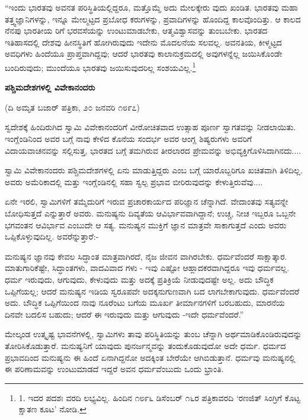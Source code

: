 “ಇಂದು ಭಾರತವು ಅವನತ ಪರಿಸ್ಥಿತಿಯಲ್ಲಿದ್ದರೂ, ಮತ್ತೊಮ್ಮೆ ಅದು ಮೇಲಕ್ಕೇರು ವುದು ಖಂಡಿತ. ಭಾರತವು ಮಹಾ ತತ್ತ್ವಜ್ಞಾನಿಗಳನ್ನು, ಇನ್ನೂ ಮೇಲ್ಮಟ್ಟದ ಪ್ರಬೋಧ ಕರುಗಳನ್ನು, ಪ್ರವಾದಿಗಳನ್ನು ಹೊಂದಿದ್ದ ಕಾಲವೊಂದಿತ್ತು. ಆ ಕಾಲದ ನೆನಪು ಭಾರತೀಯ ರಿಗೆ ಭರವಸೆಯನ್ನು ಉಂಟುಮಾಡಬೇಕು, ಆತ್ಮವಿಶ್ವಾಸವನ್ನು ತುಂಬಬೇಕು. ಭಾರತದ ಇತಿಹಾಸದಲ್ಲಿ ದೇಶವು ಹೀನಸ್ಥಿತಿಗೆ ಹೋಗಿರುವುದು ಇದೇನು ಮೊದಲನೆಯ ಸಲವಲ್ಲ. ಅವನತಿಯ, ಕೀಳ್ಮಟ್ಟದ ಅವಧಿಗಳು ಹಿಂದೆಯೂ ಪ್ರಾಪ್ತವಾಗಿದ್ದವು; ಆದರೆ ಭಾರತವು ಕಾಲಾನುಕ್ರಮದಲ್ಲಿ ಅವುಗಳನ್ನೆಲ್ಲ ಜಯಿಸಿಕೊಂಡೇ ಬಂದಿರುವುದು; ಮುಂದೆಯೂ ಭಾರತವು ಜಯಿಸುವುದರಿಲ್ಲ ಸಂಶಯವಿಲ್ಲ.\footnote{1. ಇದರ ಪದಶಃ ವರದಿ ಲಭ್ಯವಿಲ್ಲ. ಹಿಂದಿನ ೧೮೯೬ ಡಿಸೆಂಬರ್ ೧೬ರ ಪತ್ರಿಕಾವರದಿ ‘ರಣಜಿತ್ ಸಿಂಗ್ರಿಗೆ ಕೊಟ್ಟ ಕ್ಷಾತಣ ಕೂಟ’ ನೋಡಿ.}

\begin{center}
\textbf{ಪಶ್ಚಿಮದೇಶಗಳಲ್ಲಿ ವಿವೇಕಾನಂದರು}
\end{center}

\begin{center}
(ದಿ ಅಮೃತ ಬಜಾರ್ ಪತ್ರಿಕಾ, ೨೦ ಜನವರಿ ೧೮೯೭)
\end{center}

ಸ್ವದೇಶಕ್ಕೆ ಹಿಂದಿರುಗಿದ ಸ್ವಾಮಿ ವಿವೇಕಾನಂದರಿಗೆ ವೀರೋಚಿತವಾದ ಉತ್ಸಾಹ ಪೂರ್ಣ ಸ್ವಾಗತವನ್ನು ನೀಡಲಾಯಿತು. ಇಂಗ್ಲೆಂಡಿನಿಂದ ಅವರ ಬಗ್ಗೆ ನಾವು ಕೇಳಿದ ಕೊನೆಯ ಸಂದರ್ಭ ಅವರ ಆಂಗ್ಲ ಶಿಷ್ಯರುಗಳು ಅವರಿಗೆ ವಿದಾಯವಾಚನವನ್ನು ಸಲ್ಲಿಸುತ್ತ, ಭಾರತದ ಬಗ್ಗೆ ತಮಗಿರುವ ತೀರಲಾರದ ಪ್ರೇಮವನ್ನು ಅಭಿವ್ಯಕ್ತಿಗೊಳಿಸಿದಾಗಿನದು....

ಸ್ವಾಮಿ ವಿವೇಕಾನಂದರು ಪಶ್ಚಿಮದೇಶಗಳಲ್ಲಿ ಏನು ಮಾಡುತ್ತಿದ್ದರು ಎಂಬ ಬಗ್ಗೆ ಯಾರೊಬ್ಬರಿಗೂ ಖಚಿತವಾಗಿ ತಿಳಿದಿಲ್ಲ. ಅವರು ಅಮೆರಿಕಾದಲ್ಲಿ ಮತ್ತು ಇಂಗ್ಲೆಂಡಿನಲ್ಲಿ ಸಹಾ ಸ್ವಲ್ಪ ಪ್ರಭಾವ ಬೀರಿರುವುದನ್ನು ಕೇಳುತ್ತಿರುವೆವು....

ಏನೇ ಇರಲಿ, ಸ್ವಾಮಿಗಳಿಗೆ ತಮ್ಮೆದುರಿಗೆ ಇರುವ ಪ್ರಚಾರಕಾರ್ಯದ ಪರಿಜ್ಞಾನ ಚೆನ್ನಾಗಿದೆ. ವೇದಾಂತವು ಸತ್ಯವನ್ನೇ ಬೋಧಿಸುತ್ತದೆ ಎನ್ನುತ್ತಾರೆ ಅವರು. ಮನುಷ್ಯನು ದಿವ್ಯತೆಯ ಆವಿರ್ಭಾವವಾಗಿದ್ದಾನೆ; ಉಚ್ಚ, ನೀಚ ಇಬ್ಬರೂ ಒಬ್ಬನೇ ಭಗವಂತನ ಆವಿರ್ಭಾವ ಎಂಬುದೇ ಆ ಸತ್ಯ. ಮನುಷ್ಯನ ಮುಕ್ತಿಗೆ ಜ್ಞಾನ ಮಾತ್ರವೇ ಸಾಕಾಗುತ್ತದೆ ಎಂದು ಅವರು ಒಪ್ಪಿಕೊಳ್ಳುವುದಿಲ್ಲ. ಅವರೆನ್ನುತ್ತಾರೆ:-

ಮನುಷ್ಯನ ಜ್ಞಾನವು ಕೇವಲ ಸಿದ್ಧಾಂತ ಮಾತ್ರವಾಗಿರದೆ, ನೈಜ ಜೀವನ ವಾಗಿರಬೇಕು. ಧರ್ಮವೆಂದರೆ ಸಾಕ್ಷಾತ್ಕಾರ. ಮಾತುಗಾರಿಕೆಷ್ಟೇ, ಸಿದ್ಧಾಂತಗಳು, ವಾದವಿವಾದ ಗಳು - ಇವು ಎಷ್ಟೋ ಆಹ್ಲಾದಕರವಾಗಿದ್ದರೂ ಇವು ಧರ್ಮವಲ್ಲ. ಧರ್ಮ ಇರುವುದು, ಆಗುವುದು, ಕೇಳುವುದು ಮತ್ತು ಅದಕ್ಕೆ ಪ್ರತಿಕ್ರಿಯೆ ನೀಡುವುದಷ್ಟೇ ಅಲ್ಲ. ಅದು ಬೌದ್ಧಿಕ ಒಪ್ಪಿಗೆಯಲ್ಲ; ಆದರೆ ಮನುಷ್ಯನ ಇಡಿಯ ಸ್ವರೂಪವೇ ಅದಕ್ಕನುಗುಣವಾಗಿ ಬದ ಲಾಗಬೇಕಾಗುವುದು. ಧರ್ಮವೆಂದರೆ ಅದು. ಬೌದ್ಧಿಕ ಒಪ್ಪಿಗೆಯಿಂದ ನಾವು ನೂರೆಂಟು ಬಗೆಯ ಮೂರ್ಖ ತೀರ್ಮಾನಗಳಿಗೆ ಬರಬಹುದು, ಮಾರನೆಯ ದಿನವೇ ಬದಲಿಸ ಬಹುದು; ಆದರೆ ಈ ಇರುವುದು ಮತ್ತು ಆಗುವುದು -ಇದೇ ಧರ್ಮವೆಂದರೆ.”

ಮೇಲ್ಕಂಡ ಉತ್ಕೃಷ್ಟ ಭಾವನೆಗಳಲ್ಲಿ, ಸ್ವಾಮಿಗಳು ತಾವು ಪರಿಸ್ಥಿತಿಯನ್ನು ತುಂಬ ಚೆನ್ನಾಗಿ ಅರ್ಥಮಾಡಿಕೊಂಡಿರುವುದನ್ನು ತೋರಿಸಿಕೊಡುತ್ತಾರೆ. ಮನುಷ್ಯನಿಗೆ ಯಾವುದು ಪುನರ್ಜನ್ಮವನ್ನು ತಂದುಕೊಡುವುದೋ ಅದೇ ಧರ್ಮ. ಧರ್ಮದ ಪ್ರಭಾವದಿಂದ ಮನುಷ್ಯನು ಈ ಹಿಂದೆ ಏನಾಗಿದ್ದನೋ ಅದಕ್ಕಿಂತ ಬೇರೆಯೇ ಆಗಿಬಿಡುತ್ತಾನೆ. ಧರ್ಮವು ಮನುಷ್ಯನಲ್ಲಿ ಈ ಪರಿಣಾಮವನ್ನು ಉಂಟುಮಾಡದೆ ಇದ್ದರೆ ಅವನ ಧರ್ಮವೆಂಬುದು ಒಂದು ಭ್ರಾಂತಿ.

